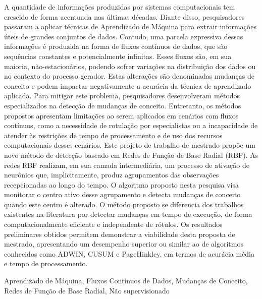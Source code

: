\documentclass[msc, classic, a4paper]{ufbathesis}
\begin{document}
A quantidade de informações produzidas por sistemas computacionais tem crescido de forma acentuada nas últimas décadas.
Diante disso, pesquisadores passaram a aplicar técnicas de Aprendizado de Máquina para extrair informações úteis de grandes conjuntos de dados.
Contudo, uma parcela expressiva dessas informações é produzida na forma de fluxos contínuos de dados, que são sequências constantes e potencialmente infinitas.
Esses fluxos são, em sua maioria, não-estacionários, podendo sofrer variações na distribuição dos dados ou no contexto do processo gerador.
Estas alterações são denominadas mudanças de conceito e podem impactar negativamente a acurácia da técnica de aprendizado aplicada.
Para mitigar este problema, pesquisadores desenvolveram métodos especializados na detecção de mudanças de conceito.
Entretanto, os métodos propostos apresentam limitações ao serem aplicados em cenários com fluxos contínuos,
como a necessidade de rotulação por especialistas ou a incapacidade de atender às restrições de tempo de processamento e de uso dos recursos computacionais desses cenários.
Este projeto de trabalho de mestrado propõe um novo método de detecção baseado em Redes de Função de Base Radial (RBF).
As redes RBF realizam, em sua camada intermediária, um processo de ativação de neurônios que, implicitamente, produz agrupamentos das observações recepcionadas ao longo do tempo.
O algoritmo proposto nesta pesquisa visa monitorar o centro ativo desse agrupamento e detecta mudanças de conceito quando este centro é alterado.
O método proposto se diferencia dos trabalhos existentes na literatura por detectar mudanças em tempo de execução, de forma computacionalmente eficiente e independente de rótulos.
Os resultados preliminares obtidos permitem demonstrar a viabilidade desta proposta de mestrado,
apresentando um desempenho superior ou similar ao de algoritmos conhecidos como ADWIN, CUSUM e PageHinkley, em termos de acurácia média e tempo de processamento.

\begin{keywords}
    Aprendizado de Máquina, Fluxos Contínuos de Dados, Mudanças de Conceito, Redes de Função de Base Radial, Não supervisionado
\end{keywords}


\end{document}

